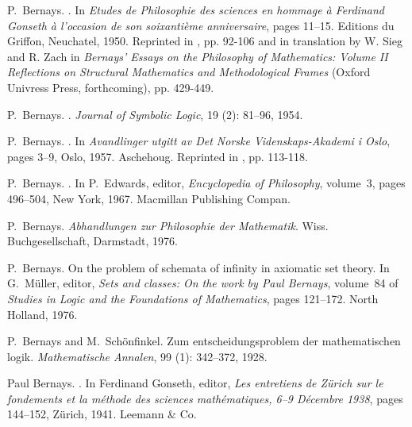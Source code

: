 \documentclass[11pt,fleqn,leqno]{article}
\begin{document}
\begin{thebibliography}{118}
P.~Bernays.
.
\newblock In \emph{{Etudes de Philosophie des sciences en hommage \`a Ferdinand
  Gonseth \`a l'occasion de son soixanti\`eme anniversaire}}, pages 11--15.
  Editions du Griffon, Neuchatel, 1950.
\newblock Reprinted in \cite{Bernays1976}, pp. 92-106 and in translation by W.
  Sieg and R. Zach in \textsl{Bernays' Essays on the Philosophy of Mathematics:
  Volume II Reflections on Structural Mathematics and Methodological Frames}
  (Oxford Univress Press, forthcoming), pp. 429-449.

P.~Bernays.
.
\newblock \emph{Journal of Symbolic Logic}, 19 (2): 81--96,
  1954.

P.~Bernays.
.
\newblock In \emph{Avandlinger utgitt av Det Norske Videnskaps-Akademi i Oslo},
  pages 3--9, Oslo, 1957. Aschehoug.
\newblock Reprinted in \cite{Bernays1976}, pp. 113-118.

P.~Bernays.
.
\newblock In P.~Edwards, editor, \emph{Encyclopedia of Philosophy}, volume~3,
  pages 496--504, New York, 1967. Macmillan Publishing Compan.

P.~Bernays.
\newblock \emph{{Abhandlungen zur Philosophie der Mathematik}}.
\newblock Wiss. Buchgesellschaft, Darmstadt, 1976{}.

P.~Bernays.
\newblock On the problem of schemata of infinity in axiomatic set theory.
\newblock In G.~M{\"u}ller, editor, \emph{{Sets and classes: On the work by
  Paul Bernays}}, volume~84 of \emph{Studies in Logic and the Foundations of
  Mathematics}, pages 121--172. North Holland, 1976{}.

P.~Bernays and M.~Sch{\"o}nfinkel.
\newblock Zum entscheidungsproblem der mathematischen logik.
\newblock \emph{Mathematische Annalen}, 99 (1): 342--372,
  1928.

Paul Bernays.
.
\newblock In Ferdinand Gonseth, editor, \emph{{Les entretiens de Z\"{u}rich sur
  le fondements et la m\'{e}thode des sciences math\'{e}matiques, 6--9
  D\'{e}cembre 1938}}, pages 144--152, {Z\"{u}rich}, 1941. Leemann \& Co.


\end{thebibliography}
\end{document}
